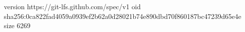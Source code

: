 version https://git-lfs.github.com/spec/v1
oid sha256:0ca822fad4059a0939ef2b62a0d28021b74e890dbd70f860187bc47239d65e4e
size 6269
